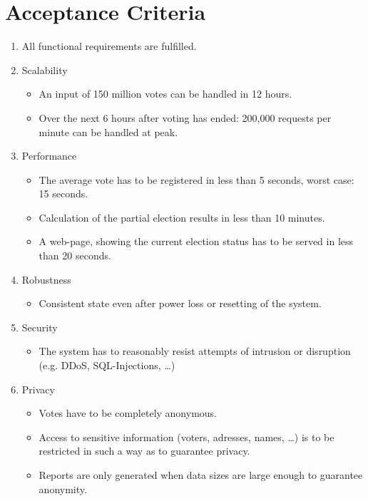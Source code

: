 \documentclass[10pt,a4paper]{article}
\begin{document}
	\section*{Acceptance Criteria}
	\begin{enumerate}
		\item \label{fuctio} All functional requirements are fulfilled.
		\item  \label{scala} Scalability
			\begin{itemize}
				\item An input of 150 million votes can be handled in 12 hours.
				\item Over the next 6 hours after voting has ended: 200,000 requests per minute can be handled at peak. 
			\end{itemize} 
		\item  \label{perf} Performance
			\begin{itemize}
				\item The average vote has to be registered in less than 5 seconds, worst case: 15 seconds.
				\item Calculation of the partial election results in less than 10 minutes.
				\item A web-page, showing the current election status has to be served in less than 20 seconds.
			\end{itemize}
		\item  \label{rob} Robustness
			\begin{itemize}
				\item Consistent state even after power loss or resetting of the system.
			\end{itemize}
			
		\item \label{safe} Security
			\begin{itemize}
				\item The system has to reasonably resist attempts of intrusion or disruption (e.g. DDoS, SQL-Injections, \dots)
			\end{itemize}
		
		\item \label{privacy} Privacy
			\begin{itemize}
				\item Votes have to be completely anonymous.
				\item Access to sensitive information (voters, adresses, names, \dots) is to be restricted in such a way as to guarantee privacy.
				\item Reports are only generated when data sizes are large enough to guarantee anonymity.
			\end{itemize}
	\end{enumerate}
\end{document}
